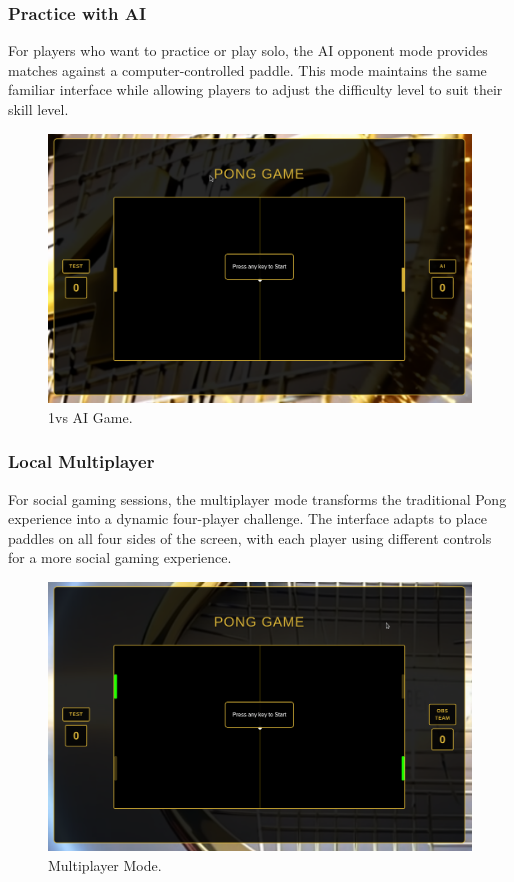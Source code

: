 \subsubsection{Practice with AI} For players who want to practice or play solo, the AI opponent mode provides matches against a computer-controlled paddle. This mode maintains the same familiar interface while allowing players to adjust the difficulty level to suit their skill level.

\begin{figure}[H]
    \centering
    \includegraphics[width=0.65\linewidth]{Figures/images/new_images/Game1vsAI.png}
    \caption{1vs AI Game.} %
    \label{fig:game-1vsai-journey}
\end{figure}

\subsubsection{Local Multiplayer} For social gaming sessions, the multiplayer mode transforms the traditional Pong experience into a dynamic four-player challenge. The interface adapts to place paddles on all four sides of the screen, with each player using different controls for a more social gaming experience.

\begin{figure}[H]
    \centering
    \includegraphics[width=0.65\linewidth]{Figures/images/new_images/GameMultiPlayer.png}
    \caption{Multiplayer Mode.} %
    \label{fig:multiplayer-game-journey}
\end{figure}

